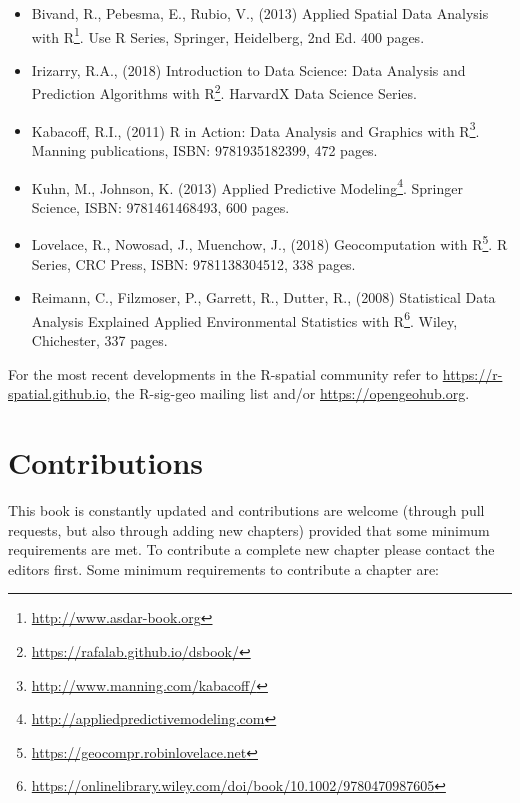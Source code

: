 \documentclass[graybox,natbib,nospthms,UStrade]{svmono}
\renewcommand{\href}[2]{#2 (\url{#1})}
\renewcommand{\href}[2]{#2\footnote{\url{#1}}}
\begin{document}
\begin{itemize}
\item
  Bivand, R., Pebesma, E., Rubio, V., (2013) \href{http://www.asdar-book.org}{Applied Spatial Data Analysis with R}. Use R Series, Springer, Heidelberg, 2nd Ed. 400 pages.
\item
  Irizarry, R.A., (2018) \href{https://rafalab.github.io/dsbook/}{Introduction to Data Science: Data Analysis and Prediction Algorithms with R}. HarvardX Data Science Series.
\item
  Kabacoff, R.I., (2011) \href{http://www.manning.com/kabacoff/}{R in Action: Data Analysis and Graphics with R}. Manning publications, ISBN: 9781935182399, 472 pages.
\item
  Kuhn, M., Johnson, K. (2013) \href{http://appliedpredictivemodeling.com}{Applied Predictive Modeling}. Springer Science, ISBN: 9781461468493, 600 pages.
\item
  Lovelace, R., Nowosad, J., Muenchow, J., (2018) \href{https://geocompr.robinlovelace.net}{Geocomputation with R}. R Series, CRC Press, ISBN: 9781138304512, 338 pages.
\item
  Reimann, C., Filzmoser, P., Garrett, R., Dutter, R., (2008) \href{https://onlinelibrary.wiley.com/doi/book/10.1002/9780470987605}{Statistical Data Analysis Explained Applied Environmental Statistics with R}. Wiley, Chichester, 337 pages.
\end{itemize}

For the most recent developments in the R-spatial community refer to \url{https://r-spatial.github.io}, the R-sig-geo mailing list and/or \url{https://opengeohub.org}.

\hypertarget{contributions}{%
\section*{Contributions}\label{contributions}}

This book is constantly updated and contributions are welcome (through pull requests, but also through adding new chapters) provided that some minimum requirements are met. To contribute a complete new chapter please contact the editors first. Some minimum requirements to contribute a chapter are:
\end{document}
